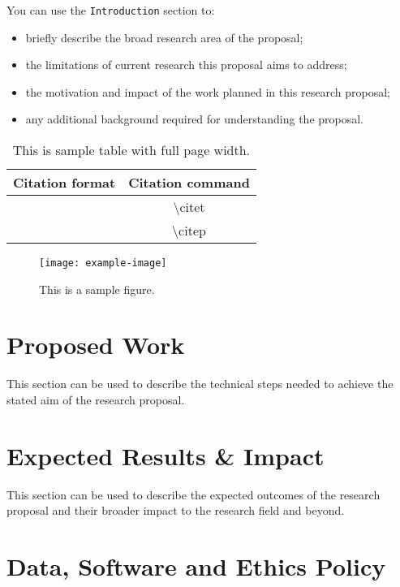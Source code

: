 \documentclass[10pt]{article}
\begin{document}
\begin{multicols*}{2}
You can use the \texttt{Introduction} section to:

\begin{itemize}
    \item briefly describe the broad research area of the proposal;
    \item the limitations of current research this proposal aims to address;
    \item the motivation and impact of the work planned in this research proposal;
    \item any additional background required for understanding the proposal.
\end{itemize}

\begin{table*}
	\centering
	\begin{tabular}{cc}
		\hline
		\textbf{Citation format} & \textbf{Citation command} \\
		\hline
		\citet{APA:83} & \textbackslash{}citet{} \\
		\citep{APA:83} & \textbackslash{}citep{} \\
		\hline
	\end{tabular}
	\caption{This is sample table with full page width.}
	\label{tbl:tbl1}
\end{table*}

	
\begin{figure}[H]
    \centering
	\texttt{[image: example-image]}
	\caption{This is a sample figure.}
	\label{fig:fig1}
\end{figure}

\section{Proposed Work}

This section can be used to describe the technical steps needed to achieve the stated aim of the research proposal.
	
\section{Expected Results \& Impact} 
	
This section can be used to describe the expected outcomes of the research proposal and their broader impact to the research field and beyond.
	
\section{Data, Software and Ethics Policy}


\end{multicols*}
\end{document}
